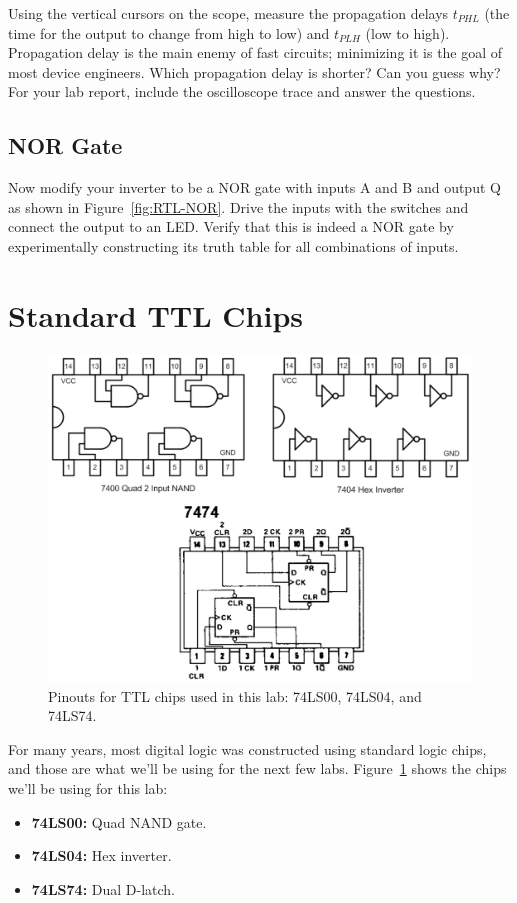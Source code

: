 \documentclass[12pt]{article}
\begin{document}
Using the vertical cursors on the scope, measure the propagation delays $t_{PHL}$ (the time for the output to change
from high to low) and $t_{PLH}$ (low to high). Propagation delay is the main enemy of fast
circuits; minimizing it is the goal of most device engineers. Which propagation delay is shorter? Can you guess why? For your lab report, include the oscilloscope trace and answer the questions.


\subsection*{NOR Gate}

Now modify your inverter to be a NOR gate with inputs A and B and output Q as shown in Figure~\ref{fig:RTL-NOR}. Drive the inputs with the switches and connect the output to an LED. Verify that this is indeed a NOR gate by experimentally constructing its truth table for all combinations of inputs.


\section*{Standard TTL Chips}


\begin{figure}[!h]
\centerline{\includegraphics[width=5in]{figs/chips.pdf}}
\caption{Pinouts for TTL chips used in this lab: 74LS00, 74LS04, and 74LS74.}
\label{fig:chips}
\end{figure}

For many years, most digital logic was constructed using standard logic chips, and those are what we'll be using for the next few labs.  
Figure~\ref{fig:chips} shows the chips we'll be using for this lab:
\begin{itemize}
\item{\bf 74LS00:} Quad NAND gate.
\item {\bf 74LS04:} Hex inverter.
\item {\bf 74LS74:} Dual D-latch.
\end{itemize}
\end{document}
